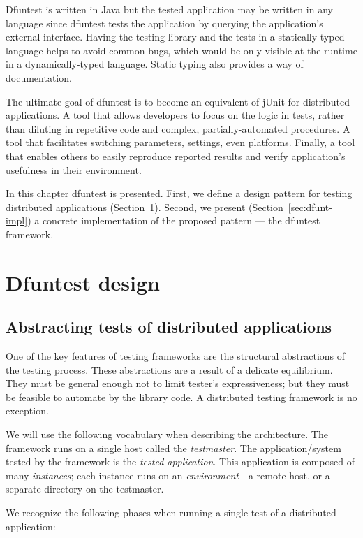 Dfuntest is written in Java but the tested application may be written in any language since dfuntest tests the application by querying the application's external interface.
Having the testing library and the tests in a statically-typed language helps to avoid common bugs, which would be only visible at the runtime in a dynamically-typed language. 
Static typing also provides a way of documentation.

The ultimate goal of dfuntest is to become an equivalent of jUnit for distributed applications.
A tool that allows developers to focus on the logic in tests, rather than diluting in repetitive code and complex, partially-automated procedures.
A tool that facilitates switching parameters, settings, even platforms.
Finally, a tool that enables others to easily reproduce reported results and verify application's usefulness in their environment.

In this chapter dfuntest is presented.
First, we define a design pattern for testing distributed applications (Section~\ref{sec:dfuntest-design}).
Second, we present (Section~\ref{sec:dfunt-impl}) a concrete implementation of the proposed pattern --- the dfuntest framework.

\section{Dfuntest design}\label{sec:dfuntest-design}

\subsection{Abstracting tests of distributed applications}
One of the key features of testing frameworks are the structural abstractions of
the testing process. These abstractions are a result of a delicate equilibrium.
They must be general enough not to limit tester's expressiveness; but they must
be feasible to automate by the library code. A distributed testing framework
is no exception.

We will use the following vocabulary when describing the architecture. 
The framework runs on a single host called the \emph{testmaster}.
The application/system tested by the framework is the \emph{tested application}.
This application is composed of many \emph{instances};
each instance runs on an \emph{environment}---a remote host, or a separate directory on the testmaster.

We recognize the following phases when running a single test of a distributed
application:

